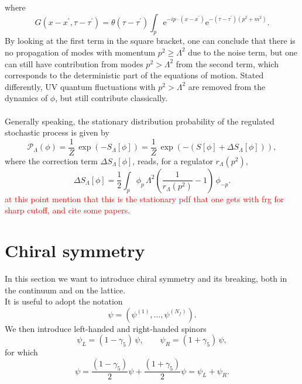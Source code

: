 where
\begin{equation*}
    G\left(x-x^{\prime}, \tau-\tau^{\prime}\right) =\theta\left(\tau-\tau^{\prime}\right) \int_p \mathrm{e}^{-i p \cdot\left(x-x^{\prime}\right)} \mathrm{e}^{-\left(\tau-\tau^{\prime}\right)\left(p^2+m^2\right)}.
\end{equation*}
By looking at the first term in the square bracket, one can conclude that there is no propagation of modes with momentum $p^2\geq \Lambda^2$ due to the noise term, but one can still have contribution from modes $p^2 > \Lambda^2$ from the second term, which corresponds to the deterministic part of the equations of motion. Stated differently, UV quantum fluctuations with $p^2 > \Lambda^2$ are removed from the dynamics of $\phi$, but still contribute classically. \\~\\
Generally speaking, the stationary distribution probability of the regulated stochastic process is given by \cite{Pawlowski2017CoolingNoise}
\begin{equation}
    \mathcal{P}_\Lambda(\phi) = \frac{1}{Z} \, \exp\left(-S_\Lambda[\phi]\right) = \frac{1}{Z} \, \exp\left(-(S[\phi] + \Delta S_\Lambda[\phi])\right),
    \label{eq:probability_field_configuration_regularised}
\end{equation}
where the correction term $\Delta S_\Lambda[\phi]$, reads, for a regulator $r_\Lambda(p^2)$,
\begin{equation*}
        \Delta S_{\Lambda}[\phi]=\frac{1}{2} \int_p \phi_p \, \Lambda^2\left(\frac{1}{r_{\Lambda}\left(p^2\right)}-1\right) \, \phi_{-p}.
\end{equation*}
\textcolor{red}{at this point mention that this is the stationary pdf that one gets with frg for sharp cutoff, and cite some papers.}

\section{Chiral symmetry}
\label{sec:chiral_symmetry}
In this section we want to introduce chiral symmetry and its breaking, both in the continuum and on the lattice. \\
It is useful to adopt the notation 
\begin{equation*}
    \psi = (\psi^{(1)}, \dots, \psi^{(N_f)}).
\end{equation*} 
We then introduce left-handed and right-handed spinors
\begin{equation*}
	\psi_L = (1-\gamma_5) \, \psi, \qquad \psi_R = (1+\gamma_5) \, \psi,
\end{equation*}
for which
\begin{equation*}
	\psi = \frac{(1-\gamma_5)}{2} \psi + \frac{(1+\gamma_5)}{2} \psi = \psi_L + \psi_R.
\end{equation*}


